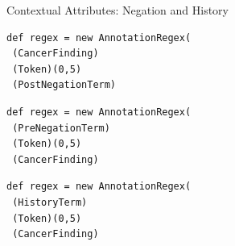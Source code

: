 \documentclass[10pt]{beamer}
\begin{document}
\begin{frame}[fragile]{Contextual Attributes: Negation and History}
\begin{lstlisting}[frame=single]
def regex = new AnnotationRegex(
 (CancerFinding)
 (Token)(0,5)
 (PostNegationTerm)
\end{lstlisting}

\begin{lstlisting}[frame=single]
def regex = new AnnotationRegex(
 (PreNegationTerm)
 (Token)(0,5)
 (CancerFinding)
\end{lstlisting}

\begin{lstlisting}[frame=single]
def regex = new AnnotationRegex(
 (HistoryTerm)
 (Token)(0,5)
 (CancerFinding)
\end{lstlisting}

\end{frame}
\end{document}
